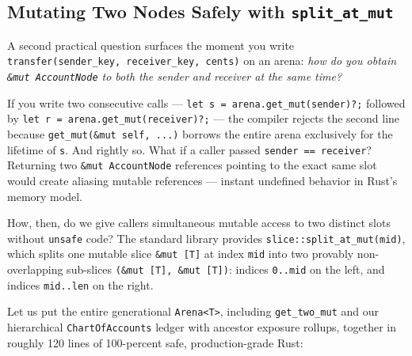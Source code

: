 \subsection{Mutating Two Nodes Safely with \texttt{split\_at\_mut}}

A second practical question surfaces the moment you write \texttt{transfer(sender\_key, receiver\_key, cents)} on an arena: \emph{how do you obtain \texttt{\&mut AccountNode} to both the sender and receiver at the same time?}

If you write two consecutive calls --- \texttt{let s = arena.get\_mut(sender)?;} followed by \texttt{let r = arena.get\_mut(receiver)?;} --- the compiler rejects the second line because \texttt{get\_mut(\&mut self, ...)} borrows the entire arena exclusively for the lifetime of \texttt{s}. And rightly so. What if a caller passed \texttt{sender == receiver}? Returning two \texttt{\&mut AccountNode} references pointing to the exact same slot would create aliasing mutable references --- instant undefined behavior in Rust's memory model.

How, then, do we give callers simultaneous mutable access to two distinct slots without \texttt{unsafe} code? The standard library provides \texttt{slice::split\_at\_mut(mid)}, which splits one mutable slice \texttt{\&mut [T]} at index \texttt{mid} into two provably non-overlapping sub-slices \texttt{(\&mut [T], \&mut [T])}: indices \texttt{0..mid} on the left, and indices \texttt{mid..len} on the right.

Let us put the entire generational \texttt{Arena<T>}, including \texttt{get\_two\_mut} and our hierarchical \texttt{Chart\allowbreak{}Of\allowbreak{}Accounts} ledger with ancestor exposure rollups, together in roughly 120 lines of 100-percent safe, production-grade Rust:

